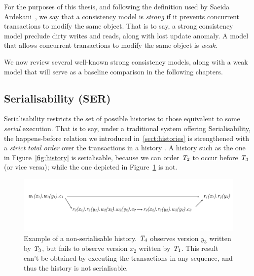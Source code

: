 For the purposes of this thesis, and following the definition used by Saeida Ardekani~\citep{ardekani_thesis}, we say that a consistency model is \emph{strong} if it prevents concurrent transactions to modify the same object. That is to say, a strong consistency model preclude dirty writes and reads, along with lost update anomaly. A model that allows concurrent transactions to modify the same object is \emph{weak}.

We now review several well-known strong consistency models, along with a weak model that will serve as a baseline comparison in the following chapters.

\subsection{Serialisability (SER)}

Serialisability restricts the set of possible histories to those equivalent to some \emph{serial} execution. That is to say, under a traditional system offering Serialisability, the happens-before relation we introduced in~\ref{sect:histories} is strengthened with a \emph{strict total order} over the transactions in a history . A history such as the one in Figure~\ref{fig:history} is serialisable, because we can order $\mathit{T}_2$ to occur before $\mathit{T}_3$ (or vice versa); while the one depicted in Figure~\ref{fig:non_ser_history} is not.

\begin{figure}[h]
  \centering
  \vspace{-0.3cm}
  \includegraphics[width=\textwidth]{figures/non_ser_hist.pdf}
  \vspace{-1cm}
  \caption{Example of a non-serialisable history. $\mathit{T}_4$ observes version $y_3$ written by $\mathit{T}_3$, but fails to observe version $x_2$ written by $\mathit{T}_1$. This result can't be obtained by executing the transactions in any sequence, and thus the history is not serialisable.}
  \label{fig:non_ser_history}
\end{figure}


